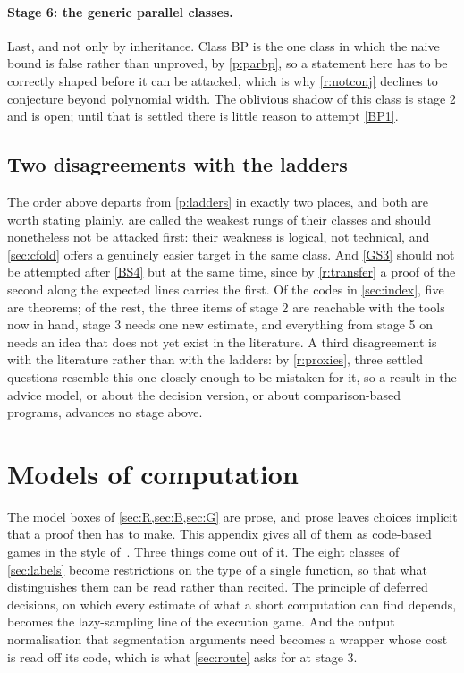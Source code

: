 \documentclass[11pt]{article}
\theoremstyle{plain}
\theoremstyle{definition}
\newcommand{\cls}[1]{\textsf{#1}}   %
\begin{document}
\paragraph{Stage 6: the generic parallel classes.}
Last, and not only by inheritance.  Class \cls{BP} is the one class in which
the naive bound is false rather than unproved, by \cref{p:parbp}, so a
statement here has to be correctly shaped before it can be attacked, which
is why \cref{r:notconj} declines to conjecture beyond polynomial width.
The oblivious shadow of this class is stage 2 and is open; until that is
settled there is little reason to attempt \cref{BP1}.

\subsection{Two disagreements with the ladders}

The order above departs from \cref{p:ladders} in exactly two places, and
both are worth stating plainly.   are called the weakest rungs
of their classes and should nonetheless not be attacked first: their
weakness is logical, not technical, and \cref{sec:cfold} offers a genuinely
easier target in the same class.  And \cref{GS3} should not be attempted
after \cref{BS4} but at the same time, since by \cref{r:transfer} a proof of
the second along the expected lines carries the first.  Of the codes in
\cref{sec:index}, five are theorems; of the rest, the three items of stage 2
are reachable with the tools now in hand, stage 3 needs one new estimate,
and everything from stage 5 on needs an idea that does not yet exist in the
literature.  A third disagreement is with the literature rather than with
the ladders: by \cref{r:proxies}, three settled questions resemble this one
closely enough to be mistaken for it, so a result in the advice model, or
about the decision version, or about comparison-based programs, advances no
stage above.

\appendix
\section{Models of computation}\label{app:models}

The model boxes of \cref{sec:R,sec:B,sec:G} are prose, and prose leaves
choices implicit that a proof then has to make.  This appendix gives all of
them as code-based games in the style of~\cite{BR06}.  Three things come out
of it.  The eight classes of \cref{sec:labels} become restrictions on the
type of a single function, so that what distinguishes them can be read
rather than recited.  The principle of deferred decisions, on which every
estimate of what a short computation can find depends, becomes the
lazy-sampling line of the execution game.  And the output normalisation that
segmentation arguments need becomes a wrapper whose cost is read off its
code, which is what \cref{sec:route} asks for at stage 3.
\end{document}
